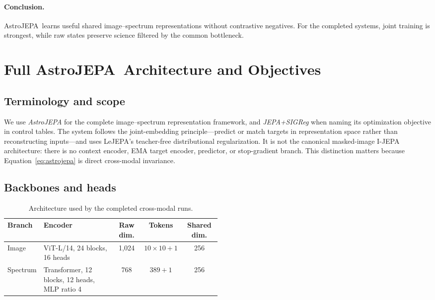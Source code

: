 \documentclass{article}
\newcommand{\method}{AstroJEPA}
\begin{document}
\paragraph{Conclusion.}
\method\ learns useful shared image--spectrum representations without
contrastive negatives.
For the completed systems, joint training is strongest, while raw states
preserve science filtered by the common bottleneck.

\clearpage



\clearpage
\appendix

\section{Full \method\ Architecture and Objectives}
\label{app:architecture}

\subsection{Terminology and scope}

We use \emph{AstroJEPA} for the complete image--spectrum representation
framework, and \emph{JEPA+SIGReg} when naming its optimization objective in
control tables.
The system follows the joint-embedding principle---predict or match targets in
representation space rather than reconstructing inputs---and uses LeJEPA's
teacher-free distributional regularization.
It is not the canonical masked-image I-JEPA architecture: there is no context
encoder, EMA target encoder, predictor, or stop-gradient branch.
This distinction matters because Equation~\ref{eq:astrojepa} is direct
cross-modal invariance.

\subsection{Backbones and heads}

\begin{table}[h]
\centering
\caption{Architecture used by the completed cross-modal runs.}
\label{tab:architecture}
\small
\setlength{\tabcolsep}{5pt}
\begin{tabular}{p{0.16\linewidth}p{0.34\linewidth}ccc}
\toprule
Branch & Encoder & Raw dim. & Tokens & Shared dim.\\
\midrule
Image & ViT-L/14, 24 blocks, 16 heads & 1,024 & $10\times10+1$ & 256\\
Spectrum & Transformer, 12 blocks, 12 heads, MLP ratio 4 & 768 & $389+1$ & 256\\
\bottomrule
\end{tabular}
\end{table}
\end{document}
